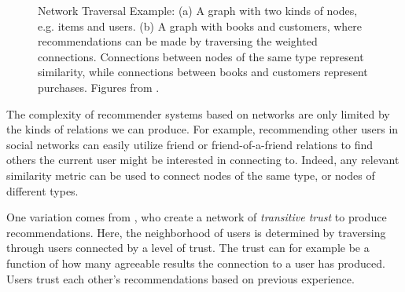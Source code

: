 \begin{figure}[t]
  \centering
  \caption[Example of Network Traversal]{Network Traversal Example: (a) A graph with two kinds of nodes,
    e.g. items and users. (b) A graph with books and customers, where recommendations
    can be made by traversing the weighted connections. Connections between nodes of the same type
    represent similarity, while connections between books and customers represent purchases.
    Figures from \cite{Huang2002}.}
  \label{fig:book-graphs}
\end{figure}
%
The complexity of recommender systems based on networks are only limited by the kinds of relations we can produce.
For example, recommending other users in social networks can easily utilize friend or friend-of-a-friend relations
to find others the current user might be interested in connecting to. Indeed, any relevant similarity metric can be used to
connect nodes of the same type, or nodes of different types.

One variation comes from \cite{Walter2008}, who create a network of \emph{transitive trust} to produce recommendations. Here,
the neighborhood of users is determined by traversing through users connected by a level of trust. 
The trust can for example be a function of how many agreeable results the connection to a user has produced.
Users trust each other's recommendations based on previous experience.

